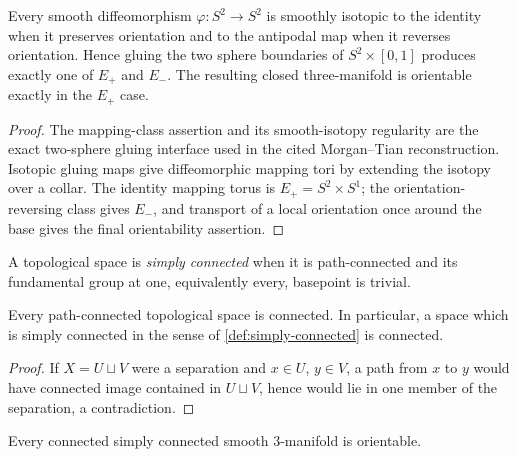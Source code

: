 \begin{lemma}
\label{lem:two-sphere-diffeomorphism-classes}
\notready
Every smooth diffeomorphism $\varphi\colon S^2\to S^2$ is smoothly isotopic
to the identity when it preserves orientation and to the antipodal map when it
reverses orientation.  Hence gluing the two sphere boundaries of
$S^2\times[0,1]$ produces exactly one of $E_+$ and $E_-$.  The resulting
closed three-manifold is orientable exactly in the $E_+$ case.
\end{lemma}

\begin{proof}
The mapping-class assertion and its smooth-isotopy regularity are the exact
two-sphere gluing interface used in the cited Morgan--Tian reconstruction.
Isotopic gluing maps give diffeomorphic mapping tori by extending the isotopy
over a collar.  The identity mapping torus is $E_+=S^2\times S^1$; the
orientation-reversing class gives $E_-$, and transport of a local
orientation once around the base gives the final orientability assertion.
\end{proof}

\begin{definition}
\label{def:simply-connected}
\notready
A topological space is \emph{simply connected} when it is path-connected and
its fundamental group at one, equivalently every, basepoint is trivial.
\end{definition}

\begin{lemma}
\label{lem:path-connected-implies-connected}
\notready
Every path-connected topological space is connected.  In particular, a space
which is simply connected in the sense of \ref{def:simply-connected} is
connected.
\end{lemma}

\begin{proof}
If $X=U\sqcup V$ were a separation and $x\in U$, $y\in V$, a path from $x$
to $y$ would have connected image contained in $U\sqcup V$, hence would lie
in one member of the separation, a contradiction.
\end{proof}

\begin{lemma}
\label{lem:simply-connected-three-manifold-orientable}
\leanok
Every connected simply connected smooth $3$-manifold is orientable.
\end{lemma}


